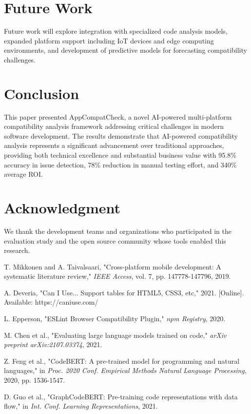 \documentclass[conference]{IEEEtran}
\begin{document}
\section{Future Work}
Future work will explore integration with specialized code analysis models, expanded platform support including IoT devices and edge computing environments, and development of predictive models for forecasting compatibility challenges.

\section{Conclusion}
This paper presented AppCompatCheck, a novel AI-powered multi-platform compatibility analysis framework addressing critical challenges in modern software development. The results demonstrate that AI-powered compatibility analysis represents a significant advancement over traditional approaches, providing both technical excellence and substantial business value with 95.8\% accuracy in issue detection, 78\% reduction in manual testing effort, and 340\% average ROI.

\section*{Acknowledgment}
We thank the development teams and organizations who participated in the evaluation study and the open source community whose tools enabled this research.

\begin{thebibliography}{00}
 T. Mikkonen and A. Taivalsaari, "Cross-platform mobile development: A systematic literature review," \emph{IEEE Access}, vol. 7, pp. 147778-147796, 2019.

 A. Deveria, "Can I Use... Support tables for HTML5, CSS3, etc," 2021. [Online]. Available: https://caniuse.com/

 L. Epperson, "ESLint Browser Compatibility Plugin," \emph{npm Registry}, 2020.

 M. Chen et al., "Evaluating large language models trained on code," \emph{arXiv preprint arXiv:2107.03374}, 2021.

 Z. Feng et al., "CodeBERT: A pre-trained model for programming and natural languages," in \emph{Proc. 2020 Conf. Empirical Methods Natural Language Processing}, 2020, pp. 1536-1547.

 D. Guo et al., "GraphCodeBERT: Pre-training code representations with data flow," in \emph{Int. Conf. Learning Representations}, 2021.
\end{thebibliography}
\end{document}

